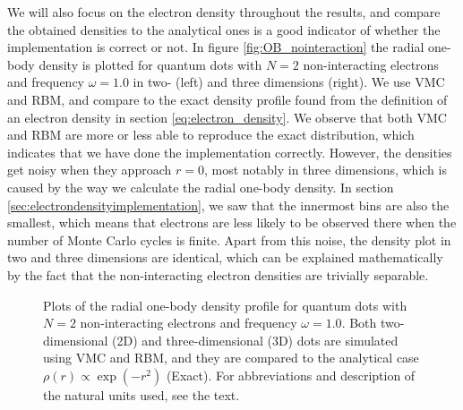 We will also focus on the electron density throughout the results, and compare the obtained densities to the analytical ones is a good indicator of whether the implementation is correct or not. In figure \eqref{fig:OB_nointeraction} the radial one-body density is plotted for quantum dots with $N=2$ non-interacting electrons and frequency $\omega=1.0$ in two- (left) and three dimensions (right). We use VMC and RBM, and compare to the exact density profile found from the definition of an electron density in section \ref{eq:electron_density}. We observe that both VMC and RBM are more or less able to reproduce the exact distribution, which indicates that we have done the implementation correctly. However, the densities get noisy when they approach $r=0$, most notably in three dimensions, which is caused by the way we calculate the radial one-body density. In section \ref{sec:electrondensityimplementation}, we saw that the innermost bins are also the smallest, which means that electrons are less likely to be observed there when the number of Monte Carlo cycles is finite. Apart from this noise, the density plot in two and three dimensions are identical, which can be explained mathematically by the fact that the non-interacting electron densities are trivially separable.

\begin{figure}
	\centering
	\captionsetup[subfigure]{labelformat=empty}
	\caption{Plots of the radial one-body density profile for quantum dots with $N=2$ non-interacting electrons and frequency $\omega=1.0$. Both two-dimensional (2D) and three-dimensional (3D) dots are simulated using VMC and RBM, and they are compared to the analytical case $\rho(r)\propto\exp(-r^2)$ (Exact). For  abbreviations and description of the natural units used, see the text.}
	\label{fig:OB_nointeraction}
\end{figure}

